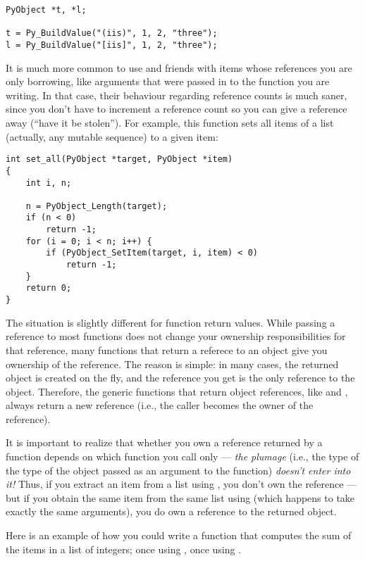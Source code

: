 \documentclass{manual}
\begin{document}
\begin{verbatim}
PyObject *t, *l;

t = Py_BuildValue("(iis)", 1, 2, "three");
l = Py_BuildValue("[iis]", 1, 2, "three");
\end{verbatim}

It is much more common to use  and
friends with items whose references you are only borrowing, like
arguments that were passed in to the function you are writing.  In
that case, their behaviour regarding reference counts is much saner,
since you don't have to increment a reference count so you can give a
reference away (``have it be stolen'').  For example, this function
sets all items of a list (actually, any mutable sequence) to a given
item:

\begin{verbatim}
int set_all(PyObject *target, PyObject *item)
{
    int i, n;

    n = PyObject_Length(target);
    if (n < 0)
        return -1;
    for (i = 0; i < n; i++) {
        if (PyObject_SetItem(target, i, item) < 0)
            return -1;
    }
    return 0;
}
\end{verbatim}

The situation is slightly different for function return values.  
While passing a reference to most functions does not change your 
ownership responsibilities for that reference, many functions that 
return a referece to an object give you ownership of the reference.
The reason is simple: in many cases, the returned object is created 
on the fly, and the reference you get is the only reference to the 
object.  Therefore, the generic functions that return object 
references, like  and 
, always return a new reference (i.e.,
the  caller becomes the owner of the reference).

It is important to realize that whether you own a reference returned 
by a function depends on which function you call only --- \emph{the
plumage} (i.e., the type of the type of the object passed as an
argument to the function) \emph{doesn't enter into it!}  Thus, if you 
extract an item from a list using , you
don't own the reference --- but if you obtain the same item from the
same list using  (which happens to
take exactly the same arguments), you do own a reference to the
returned object.

Here is an example of how you could write a function that computes the
sum of the items in a list of integers; once using 
, once using
.
\end{document}
